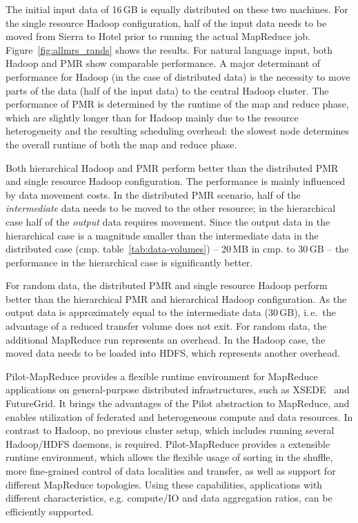\documentclass[]{paper}
\begin{document}
The initial input data of 16\,GB is equally distributed on these two machines. For the single resource Hadoop configuration, half of the input data needs to be moved from
Sierra to Hotel prior to running the actual MapReduce
job.  Figure~\ref{fig:allmrs_rands} shows the results. For natural language
input, both Hadoop and PMR show comparable performance. A major
determinant of performance for Hadoop (in the case of distributed
data) is the necessity to move parts of the data (half of the input
data) to the central Hadoop cluster. The performance of PMR is
determined by the runtime of the map and reduce phase, which are
slightly longer than for Hadoop mainly due to the resource
heterogeneity and the resulting scheduling overhead: the slowest node
determines the overall runtime of both the map and reduce phase.

Both hierarchical Hadoop and PMR perform better than
the distributed PMR and single resource Hadoop configuration. The
performance is mainly influenced by data movement costs. In the
distributed PMR scenario, half of the {\it intermediate} data needs to
be moved to the other resource; in the hierarchical case half of the
{\it output} data requires movement. Since the output data in the
hierarchical case is a magnitude smaller than the intermediate data in
the distributed case (cmp. table~\ref{tab:data-volumes}) -- 20\,MB in
cmp. to 30\,GB -- the performance in the hierarchical case is
significantly better.

For random data, the distributed PMR and single resource Hadoop
perform better than the hierarchical PMR and hierarchical Hadoop
configuration. As the output data is approximately equal to the
intermediate data (30\,GB), i.\,e.\ the advantage of a reduced
transfer volume does not exit. For random data, the additional
MapReduce run represents an overhead. In the Hadoop case, the moved
data needs to be loaded into HDFS, which represents another overhead.



Pilot-MapReduce provides a flexible runtime environment for MapReduce applications on general-purpose distributed infrastructures, such as XSEDE~\cite{xsede} and FutureGrid. It brings the advantages of the Pilot abstraction to MapReduce, and enables utilization of federated and heterogeneous compute and data resources. In contrast to Hadoop, no previous cluster setup, which includes running several Hadoop/HDFS daemons, is required. Pilot-MapReduce provides a extensible runtime environment, which allows the flexible usage of sorting in the shuffle, more fine-grained control of data localities and transfer, as well as support for different MapReduce topologies. Using these capabilities, applications with different characteristics, e.g. compute/IO and data aggregation ratios, can be efficiently supported.
\end{document}
